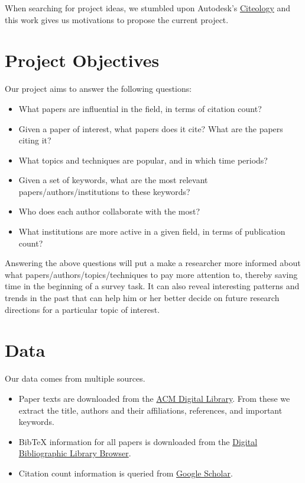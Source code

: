 \documentclass[dvips,12pt]{article}
\begin{document}
When searching for project ideas, we stumbled upon Autodesk's \href{http://www.autodeskresearch.com/projects/citeology}{Citeology} and this work gives us motivations to propose the current project.

\section{Project Objectives}
Our project aims to answer the following questions:
\begin{itemize}
    \item What papers are influential in the field, in terms of citation count?
    \item Given a paper of interest, what papers does it cite? What are the papers citing it?
    \item What topics and techniques are popular, and in which time periods?
    \item Given a set of keywords, what are the most relevant papers/authors/institutions to these keywords?
    \item Who does each author collaborate with the most?
    \item What institutions are more active in a given field, in terms of publication count?    
\end{itemize}
Answering the above questions will put a make a researcher more informed about what papers/authors/topics/techniques to pay more attention to, thereby saving time in the beginning of a survey task. It can also reveal interesting patterns and trends in the past that can help him or her better decide on future research directions for a particular topic of interest.

\section{Data}
Our data comes from multiple sources.
\begin{itemize}
    \item Paper texts are downloaded from the \href{http://dl.acm.org/}{ACM Digital Library}. From these we extract the title, authors and their affiliations, references, and important keywords.
    \item BibTeX information for all papers is downloaded from  the \href{http://dblp.uni-trier.de/db/}{Digital Bibliographic Library Browser}.
    \item Citation count information is queried from \href{https://scholar.google.com/}{Google Scholar}.
\end{itemize}
\end{document}
